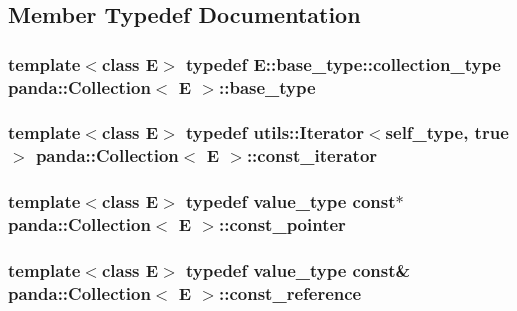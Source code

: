 \subsection{Member Typedef Documentation}
\hypertarget{classpanda_1_1Collection_a21feac1cf85f41783beabc65abd54611}{
\subsubsection[{base\_\-type}]{\setlength{\rightskip}{0pt plus 5cm}template$<$class E$>$ typedef E::base\_\-type::collection\_\-type {\bf panda::Collection}$<$ E $>$::{\bf base\_\-type}}}
\label{classpanda_1_1Collection_a21feac1cf85f41783beabc65abd54611}
\hypertarget{classpanda_1_1Collection_acc749ab7812ec93b3cdf4096e4320e17}{
\subsubsection[{const\_\-iterator}]{\setlength{\rightskip}{0pt plus 5cm}template$<$class E$>$ typedef {\bf utils::Iterator}$<${\bf self\_\-type}, true$>$ {\bf panda::Collection}$<$ E $>$::{\bf const\_\-iterator}}}
\label{classpanda_1_1Collection_acc749ab7812ec93b3cdf4096e4320e17}
\hypertarget{classpanda_1_1Collection_ab1e92c77768c1794f4493560b91612e0}{
\subsubsection[{const\_\-pointer}]{\setlength{\rightskip}{0pt plus 5cm}template$<$class E$>$ typedef {\bf value\_\-type} const$\ast$ {\bf panda::Collection}$<$ E $>$::{\bf const\_\-pointer}}}
\label{classpanda_1_1Collection_ab1e92c77768c1794f4493560b91612e0}
\hypertarget{classpanda_1_1Collection_a0b74becc406f47de15442c670ae70caf}{
\subsubsection[{const\_\-reference}]{\setlength{\rightskip}{0pt plus 5cm}template$<$class E$>$ typedef {\bf value\_\-type} const\& {\bf panda::Collection}$<$ E $>$::{\bf const\_\-reference}}}
